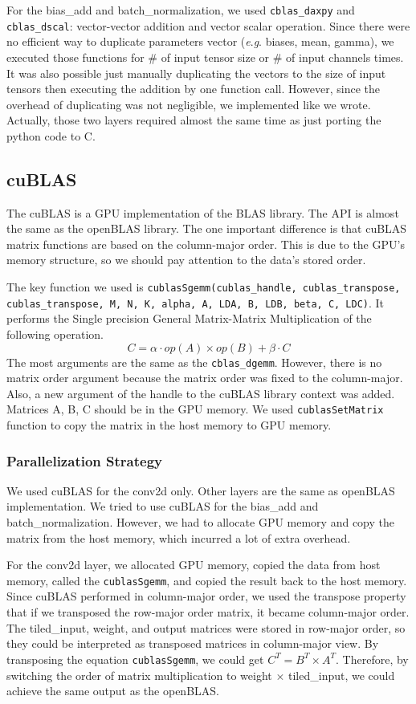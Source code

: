 \documentclass[a4paper,12pt]{article}
\newcommand{\eg}{\textit{e}.\textit{g}.}
\begin{document}
For the bias\_add and batch\_normalization, we used \lstinline{cblas_daxpy} and \lstinline{cblas_dscal}: vector-vector addition and vector scalar operation. Since there were no efficient way to duplicate parameters vector (\eg{} biases, mean, gamma), we executed those functions for \# of input tensor size or \# of input channels times. It was also possible just manually duplicating the vectors to the size of input tensors then executing the addition by one function call. However, since the overhead of duplicating was not negligible, we implemented like we wrote. Actually, those two layers required almost the same time as just porting the python code to C\@.


\subsection{cuBLAS}

The cuBLAS is a GPU implementation of the BLAS library. The API is almost the same as the openBLAS library. The one important difference is that cuBLAS matrix functions are based on the column-major order. This is due to the GPU's memory structure, so we should pay attention to the data’s stored order.

The key function we used is \lstinline{cublasSgemm(cublas_handle, cublas_transpose, cublas_transpose, M, N, K, alpha, A, LDA, B, LDB, beta, C, LDC)}. It performs the Single precision General Matrix-Matrix Multiplication of the following operation.
\[
C = \alpha \cdot op(A) \times op(B) + \beta \cdot C
\]
The most arguments are the same as the \lstinline{cblas_dgemm}. However, there is no matrix order argument because the matrix order was fixed to the column-major. Also, a new argument of the handle to the cuBLAS library context was added. Matrices A, B, C should be in the GPU memory. We used \lstinline{cublasSetMatrix} function to copy the matrix in the host memory to GPU memory.


\subsubsection{Parallelization Strategy}

We used cuBLAS for the conv2d only. Other layers are the same as openBLAS implementation. We tried to use cuBLAS for the bias\_add and batch\_normalization. However, we had to allocate GPU memory and copy the matrix from the host memory, which incurred a lot of extra overhead.

For the conv2d layer, we allocated GPU memory, copied the data from host memory, called the \lstinline{cublasSgemm}, and copied the result back to the host memory. Since cuBLAS performed in column-major order, we used the transpose property that if we transposed the row-major order matrix, it became column-major order. The tiled\_input, weight, and output matrices were stored in row-major order, so they could be interpreted as transposed matrices in column-major view. By transposing the equation \lstinline{cublasSgemm}, we could get $C^T = B^T \times A^T$. Therefore, by switching the order of matrix multiplication to weight $\times$ tiled\_input, we could achieve the same output as the openBLAS\@.
\end{document}
